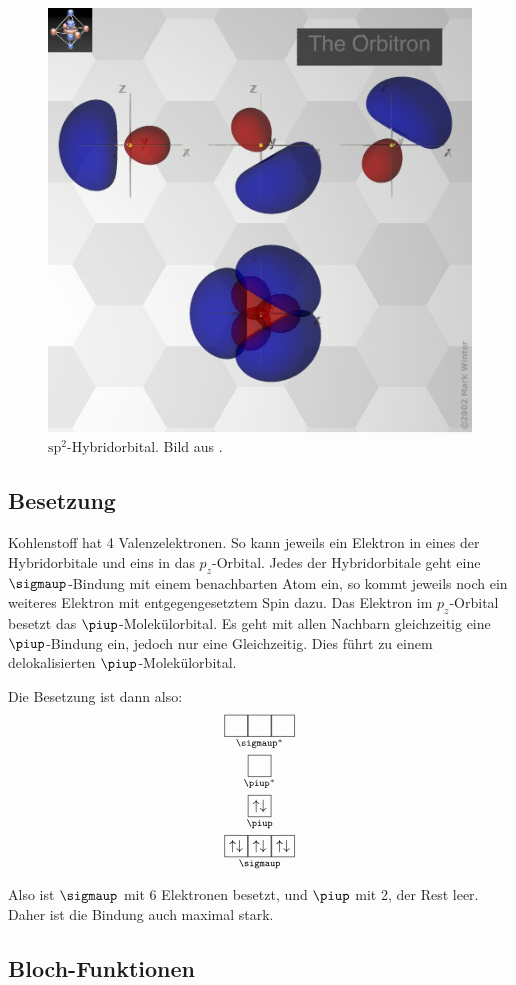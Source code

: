 \begin{figure}
	\centering
	\includegraphics[width=.5\textwidth]{sp2.png}
	\caption{%
		$\mathrm{sp^2}$-Hybridorbital. Bild aus \cite{Winter/Orbitron/sp2}.
	}
	\label{fig:sp2}
\end{figure}

\subsection{Besetzung}

Kohlenstoff hat 4 Valenzelektronen. So kann jeweils ein Elektron in eines der
Hybridorbitale und eins in das $p_z$-Orbital. Jedes der Hybridorbitale geht
eine $\sigmaup$-Bindung mit einem benachbarten Atom ein, so kommt jeweils noch
ein weiteres Elektron mit entgegengesetztem Spin dazu. Das Elektron im
$p_z$-Orbital besetzt das $\piup$-Molekülorbital. Es geht mit allen Nachbarn
gleichzeitig eine $\piup$-Bindung ein, jedoch nur eine Gleichzeitig. Dies führt
zu einem delokalisierten $\piup$-Molekülorbital.

Die Besetzung ist dann also:
\begin{gather*}
	\underset{\sigmaup^*}{\boxed{\phantom{\uparrow\downarrow}}\boxed{\phantom{\uparrow\downarrow}}\boxed{\phantom{\uparrow\downarrow}}} \\
	\underset{\piup^*}{\boxed{\phantom{\uparrow\downarrow}}} \\
	\underset{\piup}{\boxed{\uparrow\downarrow}} \\
	\underset{\sigmaup}{\boxed{\uparrow\downarrow}\boxed{\uparrow\downarrow}\boxed{\uparrow\downarrow}}
\end{gather*}

Also ist $\sigmaup$ mit 6 Elektronen besetzt, und $\piup$ mit 2, der Rest leer.
Daher ist die Bindung auch maximal stark.

\subsection{Bloch-Funktionen}

